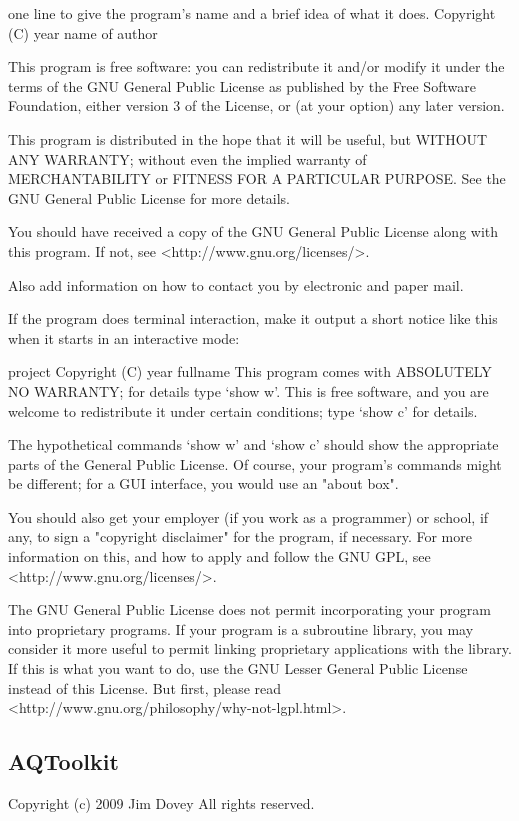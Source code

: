 \documentclass[parskip=half]{scrartcl}
\begin{document}
    {one line to give the program's name and a brief idea of what it does.}
    Copyright (C) {year}  {name of author}

    This program is free software: you can redistribute it and/or modify
    it under the terms of the GNU General Public License as published by
    the Free Software Foundation, either version 3 of the License, or
    (at your option) any later version.

    This program is distributed in the hope that it will be useful,
    but WITHOUT ANY WARRANTY; without even the implied warranty of
    MERCHANTABILITY or FITNESS FOR A PARTICULAR PURPOSE.  See the
    GNU General Public License for more details.

    You should have received a copy of the GNU General Public License
    along with this program.  If not, see <http://www.gnu.org/licenses/>.

Also add information on how to contact you by electronic and paper mail.

  If the program does terminal interaction, make it output a short
notice like this when it starts in an interactive mode:

    {project}  Copyright (C) {year}  {fullname}
    This program comes with ABSOLUTELY NO WARRANTY; for details type `show w'.
    This is free software, and you are welcome to redistribute it
    under certain conditions; type `show c' for details.

The hypothetical commands `show w' and `show c' should show the appropriate
parts of the General Public License.  Of course, your program's commands
might be different; for a GUI interface, you would use an "about box".

  You should also get your employer (if you work as a programmer) or school,
if any, to sign a "copyright disclaimer" for the program, if necessary.
For more information on this, and how to apply and follow the GNU GPL, see
<http://www.gnu.org/licenses/>.

  The GNU General Public License does not permit incorporating your program
into proprietary programs.  If your program is a subroutine library, you
may consider it more useful to permit linking proprietary applications with
the library.  If this is what you want to do, use the GNU Lesser General
Public License instead of this License.  But first, please read
<http://www.gnu.org/philosophy/why-not-lgpl.html>.

\subsection*{AQToolkit}
Copyright (c) 2009 Jim Dovey
All rights reserved.
\end{document}
